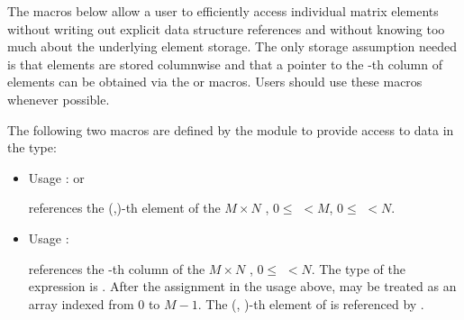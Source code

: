 The macros below  allow a user to efficiently access individual matrix           
elements without writing out explicit data structure           
references and without knowing too much about the underlying   
element storage. The only storage assumption needed is that    
elements are stored columnwise and that a pointer to the -th 
column of elements can be obtained via the  or  macros.    
Users should use these macros whenever possible.               

The following two macros are defined by the {\dense} module to provide
access to data in the  type:
\begin{itemize}
\item {}
  \par Usage :  or
  \par {} references the (,)-th element of the $M \times N$
   , $0 \le$  $< M$, $0 \le$  $< N$.
  
\item {}
  \par Usage : 
  \par {} references the -th column of the $M \times N$
   , $0 \le$  $< N$. The type of the expression          
   is  . After the assignment in the usage    
  above,  may be treated as an array indexed from $0$ to $M-1$. 
  The (, )-th element of  is referenced by .  
\end{itemize}


